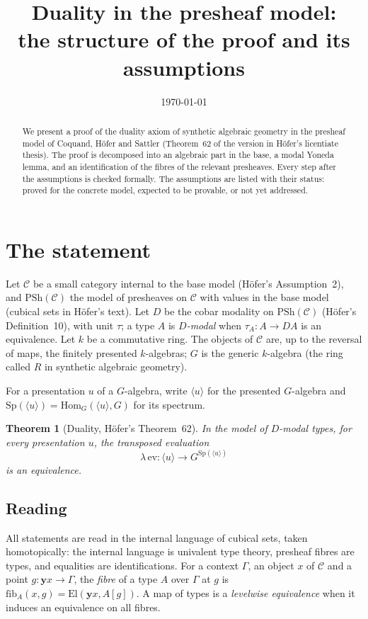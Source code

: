 \documentclass[11pt]{amsart}
\title{Duality in the presheaf model:\\ the structure of the proof and its assumptions}
\date{\today}
\newtheorem{theorem}{Theorem}[section]
\theoremstyle{definition}
\theoremstyle{remark}
\newcommand{\PSh}{\mathrm{PSh}}
\newcommand{\El}{\mathrm{El}}
\newcommand{\Hom}{\mathrm{Hom}}
\newcommand{\Sp}{\mathrm{Sp}}
\newcommand{\yo}{\mathbf{y}}
\newcommand{\pres}[1]{\langle #1\rangle}
\newcommand{\fib}{\mathrm{fib}}
\begin{document}
\maketitle

\begin{abstract}
We present a proof of the duality axiom of synthetic algebraic geometry in
the presheaf model of Coquand, H\"ofer and Sattler (Theorem~62 of the
version in H\"ofer's licentiate thesis). The proof is decomposed into an
algebraic part in the base, a modal Yoneda lemma, and an identification of
the fibres of the relevant presheaves. Every step after the assumptions is
checked formally. The assumptions are listed with their status: proved for
the concrete model, expected to be provable, or not yet addressed.
\end{abstract}

\section{The statement}

Let $\mathcal C$ be a small category internal to the base model (H\"ofer's Assumption~2), and
$\PSh(\mathcal C)$ the model of presheaves on $\mathcal C$ with values in
the base model (cubical sets in H\"ofer's text). Let $D$ be the cobar modality on $\PSh(\mathcal C)$
(H\"ofer's Definition~10), with unit $\tau$; a type $A$ is
\emph{$D$-modal} when $\tau_A\colon A\to DA$ is an equivalence. Let $k$ be
a commutative ring. The objects of $\mathcal C$ are, up to the reversal of
maps, the finitely presented $k$-algebras; $G$ is the generic $k$-algebra
(the ring called $R$ in synthetic algebraic geometry).

For a presentation $u$ of a $G$-algebra, write $\pres u$ for the presented
$G$-algebra and $\Sp(\pres u) = \Hom_{G}(\pres u, G)$ for its spectrum.

\begin{theorem}[Duality, H\"ofer's Theorem~62]\label{thm:duality}
In the model of $D$-modal types, for every presentation $u$, the transposed
evaluation
\[
  \lambda\,\mathrm{ev}\colon \pres u \longrightarrow G^{\Sp(\pres u)}
\]
is an equivalence.
\end{theorem}

\subsection*{Reading}
All statements are read in the internal language of cubical sets, taken
homotopically: the internal language is univalent type theory, presheaf
fibres are types, and equalities are identifications. For a context
$\Gamma$, an object $x$ of $\mathcal C$ and a point $g\colon \yo x\to\Gamma$,
the \emph{fibre} of a type $A$ over $\Gamma$ at $g$ is
$\fib_A(x,g) = \El(\yo x, A[g])$. A map of types is a \emph{levelwise
equivalence} when it induces an equivalence on all fibres.
\end{document}
